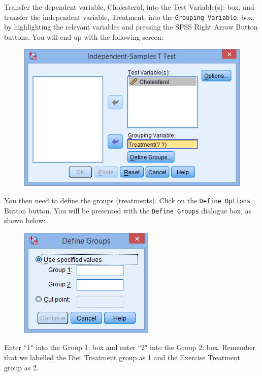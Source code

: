 \documentclass[]{article}
\begin{document}
\noindent Transfer the dependent variable, Cholesterol, into the Test Variable(s): box, and transfer the independent variable, Treatment, into the \texttt{Grouping Variable}: box, by highlighting the relevant variables and pressing the SPSS Right Arrow Button buttons. 
\newpage
You will end up with the following screen:
	
\begin{figure}[h!]
	\centering
	\includegraphics[width=0.35\linewidth]{TwoSample/TwoSampleMenu3}

	\label{fig:TwoSampleMenu3}
\end{figure}\medskip

\noindent You then need to define the groups (treatments). Click on the \texttt{Define Options} Button button. You will be presented with the \texttt{Define Groups} dialogue box, as shown below:
	
\begin{figure}[h!]
	\centering
	\includegraphics[width=0.35\linewidth]{TwoSample/TwoSampleMenu4}

	\label{fig:TwoSampleMenu4}
\end{figure}
\medskip

\noindent Enter ``1" into the Group 1: box and enter ``2" into the Group 2: box. Remember that we labelled the Diet Treatment group as 1 and the Exercise Treatment group as 2.
	
\end{document}
